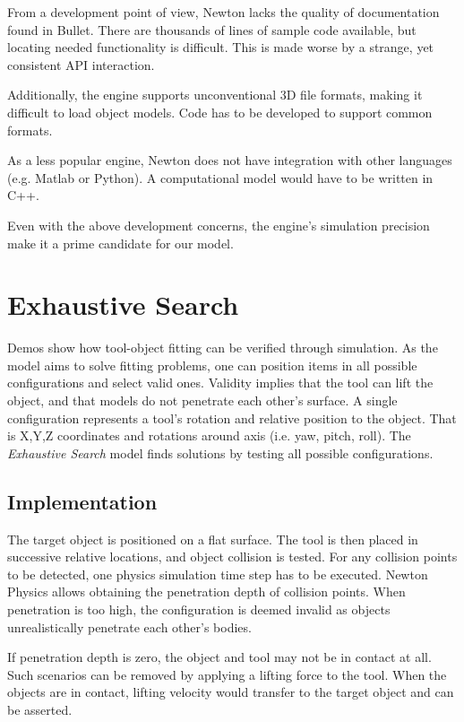 \documentclass[11]{article}
\begin{document}
From a development point of view, Newton lacks the quality of documentation found in Bullet. 
There are thousands of lines of sample code available, but locating needed functionality is difficult. 
This is made worse by a strange, yet consistent API interaction.

Additionally, the engine supports unconventional 3D file formats, making it difficult to load object models.
Code has to be developed to support common formats.

As a less popular engine, Newton does not have integration with other languages (e.g. Matlab or Python). 
A computational model would have to be written in C++.

Even with the above development concerns, the engine's simulation precision make it a prime candidate for our model.  

\section{Exhaustive Search}
Demos show how tool-object fitting can be verified through simulation.
As the model aims to solve fitting problems, one can position items in all possible configurations and select valid ones. 
Validity implies that the tool can lift the object, and that models do not penetrate each other's surface.
A single configuration represents a tool's rotation and relative position to the object.
That is X,Y,Z coordinates and rotations around axis (i.e. yaw, pitch, roll). 
The \emph{Exhaustive Search} model finds solutions by testing all possible configurations.

\subsection{Implementation}
The target object is positioned on a flat surface. 
The tool is then placed in successive relative locations, and object collision is tested. 
For any collision points to be detected, one physics simulation time step has to be executed.
Newton Physics allows obtaining the penetration depth of collision points. 
When penetration is too high, the configuration is deemed invalid as objects unrealistically penetrate each other's bodies.

If penetration depth is zero, the object and tool may not be in contact at all. 
Such scenarios can be removed by applying a lifting force to the tool.
When the objects are in contact, lifting velocity would transfer to the target object and can be asserted. 
\end{document}
